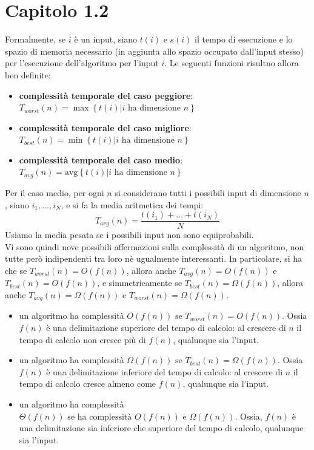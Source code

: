 \documentclass[12pt]{article}
\begin{document}
\section{Capitolo 1.2}
Formalmente, se \(i\) è un input, siano \(t(i) \text{ e } s(i)\) il tempo di esecuzione e lo spazio di memoria necessario (in aggiunta allo spazio occupato dall'input stesso) per l'esecuzione dell'algoritmo per l'input \(i\). Le seguenti funzioni risultno allora ben definite:
\begin{itemize}
    \setlength\itemsep{0em}
    \item \textbf{complessità temporale del caso peggiore}: \(T_{worst}(n) = \max\left\{t(i)|i \text{ ha dimensione }n\right\}\)
    \item \textbf{complessità temporale del caso migliore}: \(T_{best}(n) = \min\left\{t(i)|i \text{ ha dimensione }n\right\}\)
    \item \textbf{complessità temporale del caso medio}: \(T_{avg}(n) = \text{avg}\left\{t(i)|i \text{ ha dimensione }n\right\}\)
\end{itemize}
Per il caso medio, per ogni \(n\) si considerano tutti i possibili input di dimensione \(n\), siano \(i_{1},\dots, i_{N}\), e si fa la media aritmetica dei tempi:
\begin{equation}
    T_{avg}(n) = \frac{t(i_{1})+\dots+t(i_{N})}{N}
\end{equation}
Usiamo la media pesata se i possibili input non sono equiprobabili.
\\Vi sono quindi nove possibili affermazioni sulla complessità di un algoritmo, non tutte però indipendenti tra loro nè ugualmente interessanti. In particolare, si ha che se \(T_{worst}(n)=O(f(n))\), allora anche \(T_{avg}(n)=O(f(n))\) e \(T_{best}(n)=O(f(n))\), e simmetricamente se \(T_{best}(n)=\Omega(f(n))\), allora anche \(T_{avg}(n)=\Omega(f(n))\) e \(T_{worst}(n)=\Omega(f(n))\).
\begin{itemize}
    \setlength\itemsep{0em}
    \item un algoritmo ha complessità \(O(f(n)) \text{ se } T_{worst}(n)=O(f(n))\). Ossia \(f(n)\) è una delimitazione superiore del tempo di calcolo: al crescere di \(n\) il tempo di calcolo non cresce più di \(f(n)\), qualunque sia l'input.
    \item un algoritmo ha complessità \(\Omega(f(n)) \text{ se } T_{best}(n)=\Omega(f(n))\). Ossia \(f(n)\) è una delimitazione inferiore del tempo di calcolo: al crescere di \(n\) il tempo di calcolo cresce almeno come \(f(n)\), qualunque sia l'input.
    \item un algoritmo ha complessità \(\Theta(f(n)) \text{ se ha complessità } O(f(n)) \text{ e } \Omega(f(n))\). Ossia, \(f(n)\) è una delimitazione sia inferiore che superiore del tempo di calcolo, qualunque sia l'input.
\end{itemize}
\end{document}
